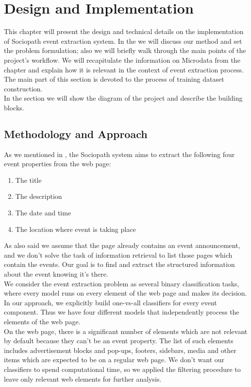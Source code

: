 \chapter{Design and Implementation}
\label{chap:design}
This chapter will present the design and technical details on the implementation of Sociopath event extraction system. In the  we will discuss our method and set the problem formulation; also we will briefly walk through the main points of the project's workflow. We will recapitulate the information on Microdata from the chapter and explain how it is relevant in the context of event extraction process. The main part of this section is devoted to the process of training dataset construction. \\

In the section  we will show the diagram of the project and describe the building blocks. 

\section{Methodology and Approach}
\label{sec:method}
As we mentioned in , the Sociopath system aims to extract the following four event properties from the web page: 

\begin{enumerate}
    \item The title
    \item The description
    \item The date and time
    \item The location where event is taking place
\end{enumerate}

As also said we assume that the page already contains an event announcement, and we don't solve the task of information retrieval to list those pages which contain the events. Our goal is to find and extract the structured information about the event knowing it's there.\\

We consider the event extraction problem as several binary classification tasks, where every model runs on every element of the web page and makes its decision. In our approach, we explicitly build one-vs-all classifiers for every event component. Thus we have four different models that independently process the elements of the web page. \\

On the web page, there is a significant number of elements which are not relevant by default because they can't be an event property. The list of such elements includes advertisement blocks and pop-ups, footers, sidebars, media and other items which are expected to be on a regular web page. We don't want our classifiers to spend computational time, so we applied the filtering procedure to leave only relevant web elements for further analysis.\\

